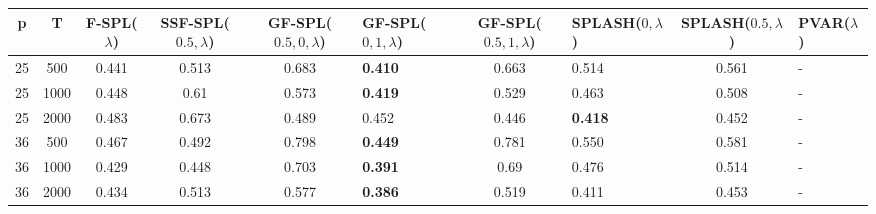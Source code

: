 \begin{tabular}{ccccclclcl}
\hline
  p  &  T   &  F-SPL($\lambda$)  &  SSF-SPL($0.5, \lambda$)  &  GF-SPL($0.5, 0, \lambda$)  & GF-SPL($0, 1, \lambda$)   &  GF-SPL($0.5, 1, \lambda$)  & SPLASH($0, \lambda$)   &  SPLASH($0.5, \lambda$)  & PVAR($\lambda$)   \\
\hline
 25  & 500  &       0.441        &           0.513           &            0.683            & \textbf{0.410}            &            0.663            & 0.514                  &          0.561           & -                 \\
 25  & 1000 &       0.448        &           0.61            &            0.573            & \textbf{0.419}            &            0.529            & 0.463                  &          0.508           & -                 \\
 25  & 2000 &       0.483        &           0.673           &            0.489            & 0.452                     &            0.446            & \textbf{0.418}         &          0.452           & -                 \\
 36  & 500  &       0.467        &           0.492           &            0.798            & \textbf{0.449}            &            0.781            & 0.550                  &          0.581           & -                 \\
 36  & 1000 &       0.429        &           0.448           &            0.703            & \textbf{0.391}            &            0.69             & 0.476                  &          0.514           & -                 \\
 36  & 2000 &       0.434        &           0.513           &            0.577            & \textbf{0.386}            &            0.519            & 0.411                  &          0.453           & -                 \\
\hline
\end{tabular}